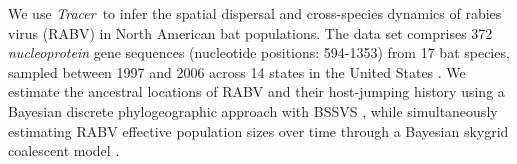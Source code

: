 \documentclass{bioinfo}
\newcommand{\tracer}{\emph{Tracer}}
\begin{document}
We use \tracer\ to infer the spatial dispersal and cross-species dynamics of rabies virus (RABV) in North American bat populations.
The data set comprises 372 \textit{nucleoprotein} gene sequences (nucleotide positions: 594-1353) from
17 bat species, sampled between 1997 and 2006 across 14 states in the United States \citep{Streicker,Faria2013}.
We estimate the ancestral locations of RABV and their host-jumping history using a Bayesian discrete phylogeographic approach with BSSVS \citep{Lemey2009}, while simultaneously estimating RABV effective population sizes over time through a Bayesian skygrid coalescent model \citep{gill2012improving}.
\end{document}
